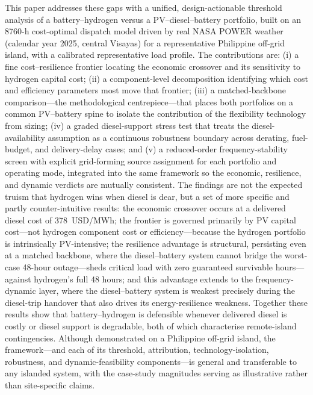 \documentclass[preprint,12pt]{elsarticle}
\begin{document}
This paper addresses these gaps with a unified, design-actionable threshold
analysis of a battery--hydrogen versus a PV--diesel--battery portfolio, built on
an 8760-h cost-optimal dispatch model driven by real NASA POWER weather (calendar
year 2025, central Visayas) for a representative Philippine off-grid island, with
a calibrated representative load profile. The contributions are: (i) a fine
cost--resilience frontier locating the economic crossover and its sensitivity to
hydrogen capital cost; (ii) a component-level decomposition identifying which cost
and efficiency parameters most move that frontier; (iii) a matched-backbone
comparison---the methodological centrepiece---that places both portfolios on a
common PV--battery spine to isolate the contribution of the flexibility technology
from sizing; (iv) a graded diesel-support stress test that treats the
diesel-availability assumption as a continuous robustness boundary across
derating, fuel-budget, and delivery-delay cases; and (v) a reduced-order
frequency-stability screen with explicit grid-forming source assignment for each
portfolio and operating mode, integrated into the same framework so the economic,
resilience, and dynamic verdicts are mutually consistent. The findings are not the
expected truism that hydrogen wins when diesel is dear, but a set of more specific
and partly counter-intuitive results: the economic crossover occurs at a delivered
diesel cost of 378~USD/MWh; the frontier is governed primarily by PV capital
cost---not hydrogen component cost or efficiency---because the hydrogen portfolio
is intrinsically PV-intensive; the resilience advantage is structural, persisting
even at a matched backbone, where the diesel--battery system cannot bridge the
worst-case 48-hour outage---sheds critical load with zero guaranteed survivable
hours---against hydrogen's full 48 hours; and this
advantage extends to the frequency-dynamic layer, where the diesel--battery system
is weakest precisely during the diesel-trip handover that also drives its
energy-resilience weakness. Together these results show that battery--hydrogen is
defensible whenever delivered diesel is costly or diesel support is degradable,
both of which characterise remote-island contingencies.
Although demonstrated on a Philippine off-grid island, the framework---and each of
its threshold, attribution, technology-isolation, robustness, and
dynamic-feasibility components---is general and transferable to any islanded
system, with the case-study magnitudes serving as illustrative rather than
site-specific claims.
\end{document}

